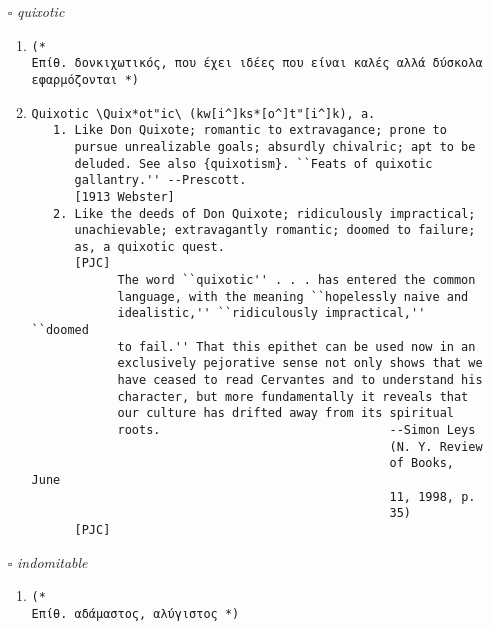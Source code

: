\documentclass{article}
\begin{document}
\begin{itemize}
\begin{enumerate}
{\begin{lstlisting}
   [1913 Webster]
         Which in our vernacular idiom may be thus interpreted.
                                                  --Pope.
   [1913 Webster]
Vernacular \Ver*nac"u*lar\, n.
   The vernacular language; one's mother tongue; often, the
   common forms of expression in a particular locality.
   [1913 Webster]
\end{lstlisting}}
\end{enumerate}
\item[$\square$] \emph{ quixotic }
\begin{enumerate}
\item{
\begin{lstlisting}
(* 
Επίθ. δονκιχωτικός, που έχει ιδέες που είναι καλές αλλά δύσκολα εφαρμόζονται *)
\end{lstlisting}}
\item{
\begin{lstlisting}
Quixotic \Quix*ot"ic\ (kw[i^]ks*[o^]t"[i^]k), a.
   1. Like Don Quixote; romantic to extravagance; prone to
      pursue unrealizable goals; absurdly chivalric; apt to be
      deluded. See also {quixotism}. ``Feats of quixotic
      gallantry.'' --Prescott.
      [1913 Webster]
   2. Like the deeds of Don Quixote; ridiculously impractical;
      unachievable; extravagantly romantic; doomed to failure;
      as, a quixotic quest.
      [PJC]
            The word ``quixotic'' . . . has entered the common
            language, with the meaning ``hopelessly naive and
            idealistic,'' ``ridiculously impractical,'' ``doomed
            to fail.'' That this epithet can be used now in an
            exclusively pejorative sense not only shows that we
            have ceased to read Cervantes and to understand his
            character, but more fundamentally it reveals that
            our culture has drifted away from its spiritual
            roots.                                --Simon Leys
                                                  (N. Y. Review
                                                  of Books, June
                                                  11, 1998, p.
                                                  35)
      [PJC]
\end{lstlisting}}
\end{enumerate}
\item[$\square$] \emph{ indomitable }
\begin{enumerate}
\item{
\begin{lstlisting}
(* 
Επίθ. αδάμαστος, αλύγιστος *)
\end{lstlisting}}

\end{enumerate}
\end{itemize}
\end{document}
